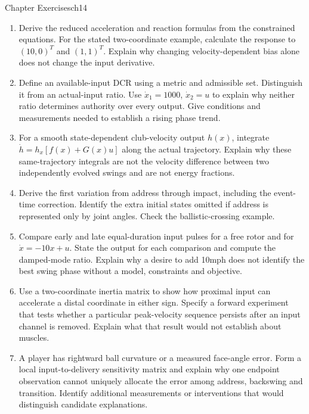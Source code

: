 \begin{exercises}{Chapter Exercises}{ch14}
\begin{enumerate}[leftmargin=*,itemsep=8pt,topsep=4pt]
\item Derive the reduced acceleration and reaction formulas from the constrained equations. For the stated two-coordinate example, calculate the response to $(10,0)^T$ and $(1,1)^T$. Explain why changing velocity-dependent bias alone does not change the input derivative.

\item Define an available-input DCR using a metric and admissible set. Distinguish it from an actual-input ratio. Use $\dot x_1=1000$, $\dot x_2=u$ to explain why neither ratio determines authority over every output. Give conditions and measurements needed to establish a rising phase trend.

\item For a smooth state-dependent club-velocity output $h(x)$, integrate $\dot h=h_x[f(x)+G(x)u]$ along the actual trajectory. Explain why these same-trajectory integrals are not the velocity difference between two independently evolved swings and are not energy fractions.

\item Derive the first variation from address through impact, including the event-time correction. Identify the extra initial states omitted if address is represented only by joint angles. Check the ballistic-crossing example.

\item Compare early and late equal-duration input pulses for a free rotor and for $\dot x=-10x+u$. State the output for each comparison and compute the damped-mode ratio. Explain why a desire to add 10mph does not identify the best swing phase without a model, constraints and objective.

\item Use a two-coordinate inertia matrix to show how proximal input can accelerate a distal coordinate in either sign. Specify a forward experiment that tests whether a particular peak-velocity sequence persists after an input channel is removed. Explain what that result would not establish about muscles.

\item A player has rightward ball curvature or a measured face-angle error. Form a local input-to-delivery sensitivity matrix and explain why one endpoint observation cannot uniquely allocate the error among address, backswing and transition. Identify additional measurements or interventions that would distinguish candidate explanations.


\end{enumerate}
\end{exercises}
